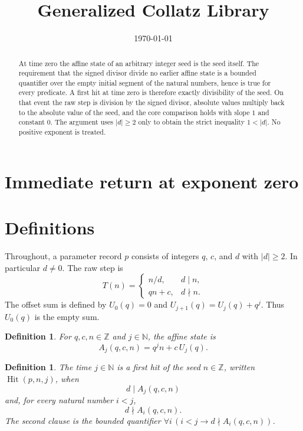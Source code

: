 \documentclass[11pt,letterpaper]{article}
\title{Generalized Collatz Library}
\author{}
\date{\today}
\newcommand{\N}{\mathbb{N}}
\newcommand{\Z}{\mathbb{Z}}
\newtheorem{definition}[theorem]{Definition}
\begin{document}
\maketitle
\section*{Immediate return at exponent zero}

\begin{abstract}
At time zero the affine state of an arbitrary integer seed is the seed itself.
The requirement that the signed divisor divide no earlier affine state is a
bounded quantifier over the empty initial segment of the natural numbers, hence
is true for every predicate. A first hit at time zero is therefore exactly
divisibility of the seed. On that event the raw step is division by the signed
divisor, absolute values multiply back to the absolute value of the seed, and
the core comparison holds with slope \(1\) and constant \(0\). The argument uses
\(|d|\ge 2\) only to obtain the strict inequality \(1<|d|\). No positive
exponent is treated.
\end{abstract}

\section{Definitions}

Throughout, a parameter record \(p\) consists of integers \(q\), \(c\), and
\(d\) with \(|d|\ge 2\). In particular \(d\neq 0\). The raw step is
\[
T(n)=\begin{cases}
n/d, & d\mid n,\\
qn+c, & d\nmid n.
\end{cases}
\]
The offset sum is defined by \(U_0(q)=0\) and
\(U_{j+1}(q)=U_j(q)+q^j\). Thus \(U_0(q)\) is the empty sum.

\begin{definition}
\label{def:affine-state}
For \(q,c,n\in\Z\) and \(j\in\N\), the affine state is
\[
A_j(q,c,n)=q^j n+c\,U_j(q).
\]
\end{definition}

\begin{definition}
\label{def:first-hit}
The time \(j\in\N\) is a first hit of the seed \(n\in\Z\), written
\(\operatorname{Hit}(p,n,j)\), when
\[
d\mid A_j(q,c,n)
\]
and, for every natural number \(i<j\),
\[
d\nmid A_i(q,c,n).
\]
The second clause is the bounded quantifier \(\forall i\,(i<j\rightarrow
d\nmid A_i(q,c,n))\).
\end{definition}
\end{document}
